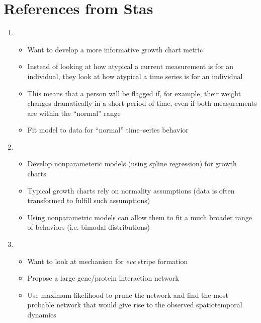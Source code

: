 \documentclass[12pt]{article}
\begin{document}
\section{References from Stas}

\begin{enumerate}

\item {}
\begin{itemize}
		\item Want to develop a more informative growth chart metric
		\item Instead of looking at how atypical a current measurement is for an individual, they look at how atypical a time series is for an individual 
		\item This means that a person will be flagged if, for example, their weight changes dramatically in a short period of time, even if both measurements are within the ``normal'' range
		\item Fit model to data for ``normal'' time--series behavior
\end{itemize}

\item {}
\begin{itemize}
	\item Develop nonparameteric models (using spline regression) for growth charts
	\item Typical growth charts rely on normality assumptions (data is often transformed to fulfill such assumptions)
	\item Using nonparametric models can allow them to fit a much broader range of behaviors (i.e. bimodal distributions)
\end{itemize}

\item {}
\begin{itemize}
	\item Want to look at mechanism for {\em eve} stripe formation
	\item Propose a large gene/protein interaction network
	\item Use maximum likelihood to prune the network and find the most probable network that would give rise to the observed spatiotemporal dynamics
\end{itemize}


\end{enumerate}
\end{document}
